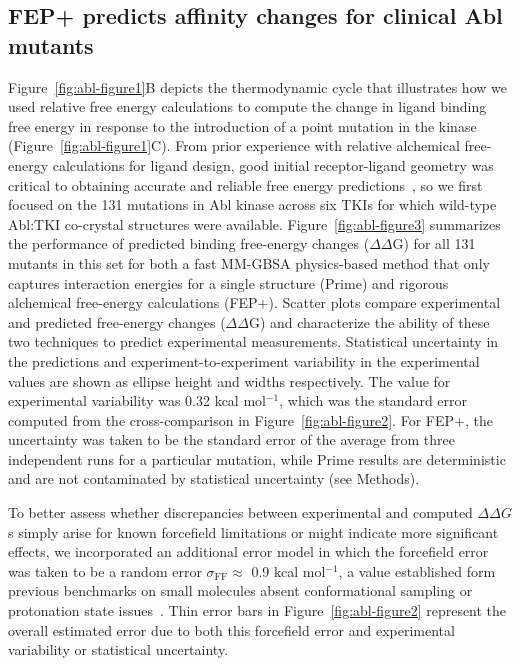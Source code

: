 \documentclass[phd,tocprelim]{cornell}
\begin{document}
\subsection{FEP+ predicts affinity changes for clinical Abl mutants}
Figure~\ref{fig:abl-figure1}B depicts the thermodynamic cycle that illustrates how we used relative free energy calculations to compute the change in ligand binding free energy in response to the introduction of a point mutation in the kinase (Figure~\ref{fig:abl-figure1}C).
From prior experience with relative alchemical free-energy calculations for ligand design, good initial receptor-ligand geometry was critical to obtaining accurate and reliable free energy predictions~\citep{Wang:J.Am.Chem.Soc.:2015}, so we first focused on the 131 mutations in Abl kinase across six TKIs for which wild-type Abl:TKI co-crystal structures were available. Figure~\ref{fig:abl-figure3} summarizes the performance of predicted binding free-energy changes ($\Delta \Delta$G) for all 131 mutants in this set for both a fast MM-GBSA physics-based method that only captures interaction energies for a single structure (Prime) and rigorous alchemical free-energy calculations (FEP+).
Scatter plots compare experimental and predicted free-energy changes ($\Delta\Delta$G) and characterize the ability of these two techniques to predict experimental measurements.
Statistical uncertainty in the predictions and experiment-to-experiment variability in the experimental values are shown as ellipse height and widths respectively.
The value for experimental variability was 0.32 kcal mol$^{-1}$, which was the standard error computed from the cross-comparison in Figure~\ref{fig:abl-figure2}.
For FEP+, the uncertainty was taken to be the standard error of the average from three independent runs for a particular mutation, while Prime results are deterministic and are not contaminated by statistical uncertainty (see Methods).

To better assess whether discrepancies between experimental and computed $\Delta\Delta G$s simply arise for known forcefield limitations or might indicate more significant effects, we incorporated an additional error model in which the forcefield error was taken to be a random error $\sigma_\mathrm{FF} \approx$ 0.9 kcal mol$^{-1}$, a value established form previous benchmarks on small molecules absent conformational sampling or protonation state issues~\cite{Harder:J.Chem.TheoryComput.:2016}.
Thin error bars in Figure~\ref{fig:abl-figure2} represent the overall estimated error due to both this forcefield error and experimental variability or statistical uncertainty. 
\end{document}
